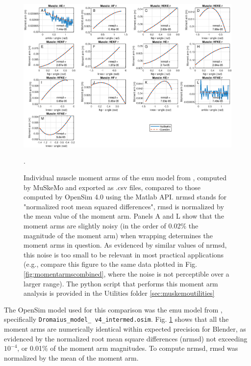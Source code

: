 \documentclass{article}
\begin{document}
\begin{figure}[htbp]
    \centering
    \includegraphics[width=1\textwidth]{figures/emu_momentarms_individual_v2.eps} %
    \caption{Individual muscle moment arms of the emu model from \cite{vanbijlertMusclecontrolledPhysicsSimulations2024a}, computed by MuSkeMo and exported as .csv files, compared to those computed by OpenSim 4.0 using the Matlab API. nrmsd stands for "normalized root mean squared differences", rmsd is normalized by the mean value of the moment arm. Panels A and L show that the moment arms are slightly noisy (in the order of 0.02\% the magnitude of the moment arm) when wrapping determines the moment arms in question. As evidenced by similar values of nrmsd, this noise is too small to be relevant in most practical applications (e.g., compare this figure to the same data plotted in Fig. \ref{fig:momentarmscombined}, where the noise is not perceptible over a larger range).   
    The python script that performs this moment arm analysis is provided in the Utilities folder \ref{sec:muskemoutilities}}.
    \label{fig:momentarmsinvididual}
\end{figure}

The OpenSim model used for this comparison was the emu model from \cite{vanbijlertMusclecontrolledPhysicsSimulations2024a}, specifically \texttt{Dromaius\_model\_ \allowbreak v4\_intermed.\allowbreak osim}. Fig. \ref{fig:momentarmsinvididual} shows that all the moment arms are numerically identical within expected precision for Blender, as evidenced by the normalized root mean square differences (nrmsd) not exceeding \(10^{-4}\), or 0.01\% of the moment arm magnitudes. To compute nrmsd, rmsd was normalized by the mean of the moment arm.
\end{document}
